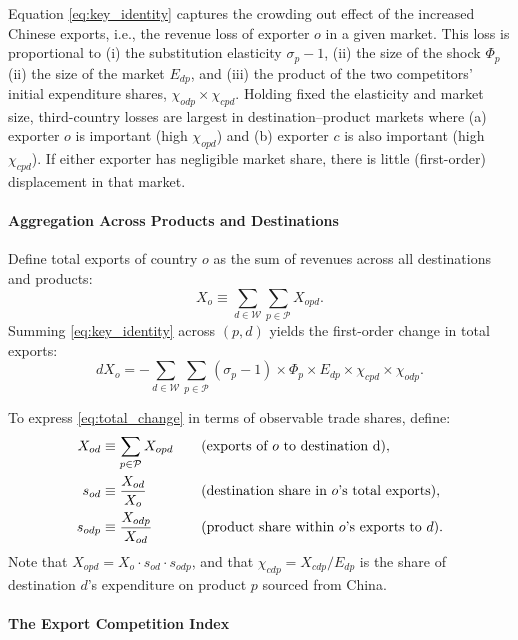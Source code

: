 \documentclass[english,12pt]{article}
\theoremstyle{definition}
\begin{document}
Equation \eqref{eq:key_identity} captures the crowding out effect of the
increased Chinese exports, i.e., the revenue loss of exporter $o$ in a given
market. This loss is proportional to (i) the substitution elasticity $\sigma
_{p}-1$, (ii) the size of the shock $\Phi _{p}$ (ii) the size of the market $%
E_{dp}$, and (iii) the product of the two competitors' initial expenditure
shares, $\chi _{odp}\times \chi _{cpd}$. Holding fixed the elasticity and
market size, third-country losses are largest in destination--product
markets where (a) exporter $o$ is important (high $\chi _{opd}$) and (b)
exporter $c$ is also important (high $\chi _{cpd}$). If either exporter has
negligible market share, there is little (first-order) displacement in that
market.

\paragraph{Aggregation Across Products and Destinations}

Define total exports of country $o$ as the sum of revenues across all
destinations and products: 
\begin{equation*}
X_{o}\equiv \sum_{d\in \mathcal{W}}\sum_{p\in \mathcal{P}}X_{opd}.
\end{equation*}%
Summing \eqref{eq:key_identity} across $(p,d)$ yields the first-order change
in total exports: 
\begin{equation}
dX_{o}=-\sum_{d\in \mathcal{W}}\sum_{p\in \mathcal{P}}(\sigma _{p}-1)\times
\Phi _{p}\times E_{dp}\times \chi _{cpd}\times \chi _{odp}.
\label{eq:total_change}
\end{equation}

To express \eqref{eq:total_change} in terms of observable trade shares,
define: 
\begin{align}
X_{od}& \equiv \sum_{p\in \mathcal{P}}X_{opd}\quad & & \text{(exports of $o$
to destination d)}, \\
s_{od}& \equiv \frac{X_{od}}{X_{o}}\quad & & \text{(destination share in $o$%
's total exports)}, \\
s_{odp}& \equiv \frac{X_{odp}}{X_{od}}\quad & & \text{(product share within $%
o$'s exports to }d\text{)}.
\end{align}%
Note that $X_{opd}=X_{o}\cdot s_{od}\cdot s_{odp}$, and that $\chi
_{cdp}=X_{cdp}/E_{dp}$ is the share of destination $d$'s expenditure on
product $p$ sourced from China.

\paragraph{The Export Competition Index}
\end{document}
